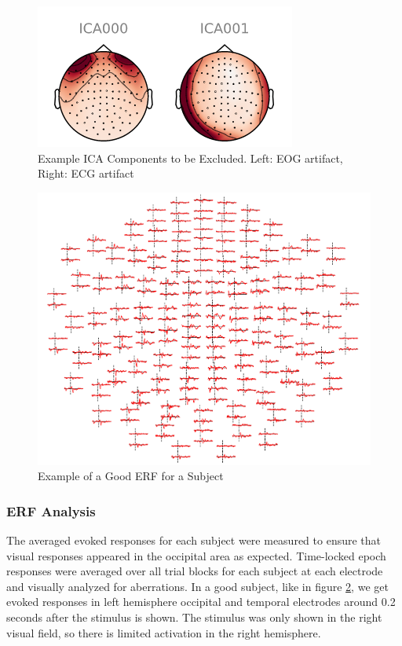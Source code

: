 \documentclass[../main.tex]{subfiles}
\begin{document}
\begin{figure}[h]
    \centering
    \includegraphics{figures/methods/ica_figure.PNG}
    \caption{Example ICA Components to be Excluded. Left: EOG artifact, Right: ECG artifact}
    \label{ica_exclude}
\end{figure}

\begin{figure}[h]
    \centering
    \includegraphics[scale=0.8]{figures/methods/good_topomap.PNG}
    \caption{Example of a Good ERF for a Subject}
    \label{good_topomap}
\end{figure}

\subsubsection{ERF Analysis}
The averaged evoked responses for each subject were measured to ensure that visual responses
appeared in the occipital area as expected. Time-locked epoch responses were averaged over all
trial blocks for each subject at each electrode and visually analyzed for aberrations. In a good subject, like in figure \ref{good_topomap}, we get evoked responses in left hemisphere occipital and temporal electrodes around 0.2 seconds after the stimulus is shown. The stimulus was only shown in the right visual field, so there is limited activation in the right hemisphere.
\end{document}
